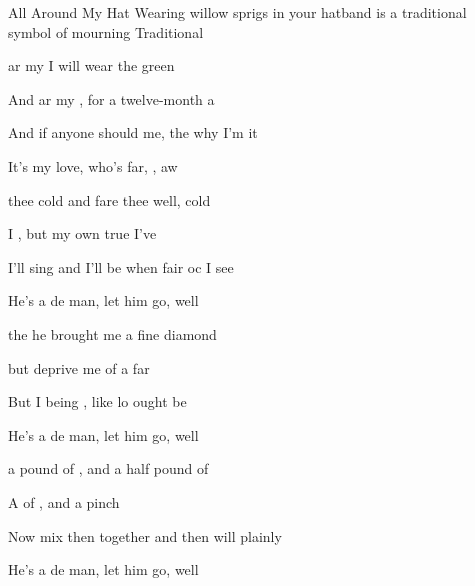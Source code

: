 \begin{SBSong}{All Around My Hat}
  {Wearing willow sprigs in your hatband is a traditional symbol of mourning}
  {Traditional}
  \begin{SBChorus}
 	 ar my  I will wear the green 
 	
 	And  ar my , for a twelve-month  a 

 	And if anyone should  me, the  why I'm  it 
 	
    It's   my  love, who's far, , aw 
  \end{SBChorus}
  \begin{SBVerse}
 	 thee  cold  and fare thee well, cold 

 	  I , but my own true  I've 

 	I'll sing and I'll be  when fair oc I  see 

 	He's a  de  man, let him go, well 
  \end{SBVerse}
  \begin{SBVerse}
 	 the   he brought me a fine diamond 
 	
 	but    deprive me of a far  
 	
 	But I being , like lo ought  be 
 	
 	He's a  de  man, let him go, well 
  \end{SBVerse}
  \begin{SBVerse}
     a  pound of , and a half pound of 
    
    A   of , and a pinch  
    
    Now mix then  together and then  will plainly  
    
    He's a  de  man, let him go, well 
  \end{SBVerse}
\end{SBSong}
